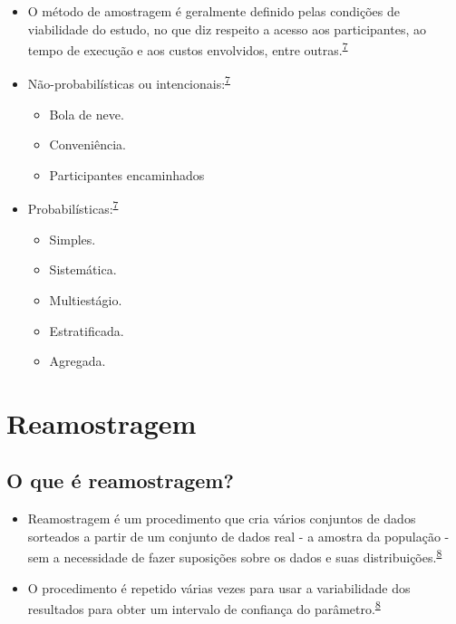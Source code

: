 \documentclass[
  a4paper,
]{book}
\begin{document}
\begin{itemize}
\item
  O método de amostragem é geralmente definido pelas condições de viabilidade do estudo, no que diz respeito a acesso aos participantes, ao tempo de execução e aos custos envolvidos, entre outras.\textsuperscript{\protect\hyperlink{ref-Banerjee2010}{7}}
\item
  Não-probabilísticas ou intencionais:\textsuperscript{\protect\hyperlink{ref-Banerjee2010}{7}}

  \begin{itemize}
  \item
    Bola de neve.
  \item
    Conveniência.
  \item
    Participantes encaminhados
  \end{itemize}
\item
  Probabilísticas:\textsuperscript{\protect\hyperlink{ref-Banerjee2010}{7}}

  \begin{itemize}
  \item
    Simples.
  \item
    Sistemática.
  \item
    Multiestágio.
  \item
    Estratificada.
  \item
    Agregada.
  \end{itemize}
\end{itemize}

\hypertarget{reamostragem}{%
\section{Reamostragem}\label{reamostragem}}

\hypertarget{o-que-uxe9-reamostragem}{%
\subsection{O que é reamostragem?}\label{o-que-uxe9-reamostragem}}

\begin{itemize}
\item
  Reamostragem é um procedimento que cria vários conjuntos de dados sorteados a partir de um conjunto de dados real - a amostra da população - sem a necessidade de fazer suposições sobre os dados e suas distribuições.\textsuperscript{\protect\hyperlink{ref-Bland2015}{8}}
\item
  O procedimento é repetido várias vezes para usar a variabilidade dos resultados para obter um intervalo de confiança do parâmetro.\textsuperscript{\protect\hyperlink{ref-Bland2015}{8}}
\end{itemize}
\end{document}
